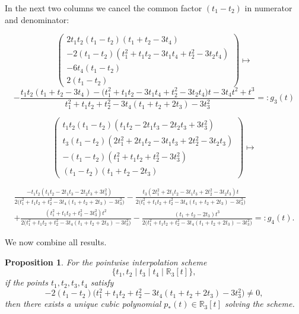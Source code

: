 \documentclass{article}
\newtheorem{proposition}[theorem]{Proposition}	%
\theoremstyle{definition}
\theoremstyle{definition}
\numberwithin{figure}{section}
\newcommand{\1}{\mathbf{1}}
\begin{document}
In the next two columns we cancel the common factor \((t_1 - t_2)\) in numerator and denominator:

\[
\begin{pmatrix}
    2 t_1 t_2 (t_1-t_2)(t_1+t_2-3 t_4)\\
    -2 (t_1-t_2)\!\left(t_1^2+t_1 t_2-3 t_1 t_4+t_2^2-3 t_2 t_4\right)\\
    -6 t_4 (t_1-t_2)\\
    2 (t_1-t_2)
\end{pmatrix}
\mapsto
\]
\[
-\frac{
    t_1 t_2 (t_1+t_2-3t_4)
    - \bigl(t_1^2+t_1 t_2-3 t_1 t_4+t_2^2-3 t_2 t_4\bigr)t
    - 3 t_4 t^2 + t^3
}{
    t_1^2+t_1t_2+t_2^2 - 3t_4(t_1+t_2+2t_3) - 3 t_3^2
}
=: g_3(t)
\]

\[
\begin{pmatrix}
    t_1 t_2 (t_1-t_2)\!\left(t_1 t_2-2 t_1 t_3-2 t_2 t_3+3 t_3^2\right)\\
    t_3 (t_1-t_2)\!\left(2 t_1^2+2 t_1 t_2-3 t_1 t_3+2 t_2^2-3 t_2 t_3\right)\\
    -(t_1-t_2)\!\left(t_1^2+t_1 t_2+t_2^2-3 t_3^2\right)\\
    (t_1-t_2)\!\left(t_1+t_2-2 t_3\right)
\end{pmatrix}
\mapsto
\]

{\small
\begin{multline*}
 \frac{
    -t_1 t_2\!\left(t_1 t_2-2 t_1 t_3-2 t_2 t_3+3 t_3^2\right)
 }{
    2\bigl(t_1^2+t_1t_2+t_2^2 -3t_4(t_1+t_2+2t_3) - 3 t_3^2\bigr)
 }
 - \frac{
    t_3\!\left(2 t_1^2+2 t_1 t_2-3 t_1 t_3+2 t_2^2-3 t_2 t_3\right)t
 }{
    2\bigl(t_1^2+t_1t_2+t_2^2 -3t_4(t_1+t_2+2t_3) - 3 t_3^2\bigr)
 } \\
 + \frac{
    \left(t_1^2+t_1 t_2+t_2^2 - 3 t_3^2\right)t^2
 }{
    2\bigl(t_1^2+t_1t_2+t_2^2 -3t_4(t_1+t_2+2t_3) - 3 t_3^2\bigr)
 }
 - \frac{
    (t_1+t_2-2 t_3)t^3
 }{
    2\bigl(t_1^2+t_1t_2+t_2^2 -3t_4(t_1+t_2+2t_3) - 3 t_3^2\bigr)
 }
 =: g_4(t).
\end{multline*}
}

We now combine all results.

\begin{proposition}\label{prop-datchiki}
For the pointwise interpolation scheme
\[
 \{t_1,t_2 \mid t_3 \mid t_4 \mid \mathbb{R}_{3}[t]\},
\]
if the points \(t_1,t_2,t_3,t_4\) satisfy
\[
-2(t_1-t_2)\bigl(t_1^2+t_1t_2+t_2^2 -3t_4(t_1+t_2+2t_3) - 3t_3^2\bigr) \neq 0,
\]
then there exists a unique cubic polynomial \(p_*(t)\in\mathbb{R}_3[t]\) solving the scheme.
\end{proposition}
\end{document}
